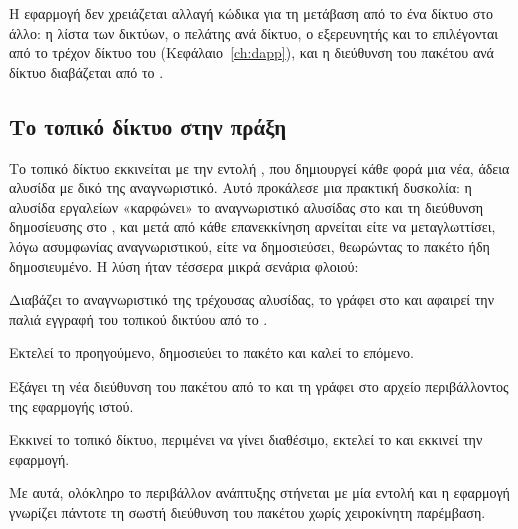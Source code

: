 Η εφαρμογή δεν χρειάζεται αλλαγή κώδικα για τη μετάβαση από το ένα δίκτυο στο άλλο: η
λίστα των δικτύων, ο πελάτης ανά δίκτυο, ο εξερευνητής και το  επιλέγονται από
το τρέχον δίκτυο του  (Κεφάλαιο~\ref{ch:dapp}), και η διεύθυνση του πακέτου
ανά δίκτυο διαβάζεται από το .

\subsection{Το τοπικό δίκτυο στην πράξη}

Το τοπικό δίκτυο εκκινείται με την εντολή
, που δημιουργεί κάθε φορά μια νέα,
άδεια αλυσίδα με δικό της αναγνωριστικό. Αυτό προκάλεσε μια πρακτική δυσκολία: η αλυσίδα εργαλείων «καρφώνει» το αναγνωριστικό αλυσίδας στο
 και τη διεύθυνση δημοσίευσης στο , και μετά από κάθε
επανεκκίνηση αρνείται είτε να μεταγλωττίσει, λόγω ασυμφωνίας αναγνωριστικού, είτε να
δημοσιεύσει, θεωρώντας το πακέτο ήδη δημοσιευμένο. Η λύση ήταν τέσσερα μικρά σενάρια
φλοιού:

\begin{description}[leftmargin=1.2em,itemsep=1pt]
  \item[\code{reset-localnet-pins.sh}] Διαβάζει το αναγνωριστικό της τρέχουσας αλυσίδας,
    το γράφει στο  και αφαιρεί την παλιά εγγραφή του τοπικού δικτύου από
    το .
  \item[\code{deploy.sh}] Εκτελεί το προηγούμενο, δημοσιεύει το πακέτο και καλεί το
    επόμενο.
  \item[\code{sync-env.sh}] Εξάγει τη νέα διεύθυνση του πακέτου από το
     και τη γράφει στο αρχείο περιβάλλοντος της εφαρμογής ιστού.
  \item[\code{dev.sh}] Εκκινεί το τοπικό δίκτυο, περιμένει να γίνει διαθέσιμο, εκτελεί το
     και εκκινεί την εφαρμογή.
\end{description}

Με αυτά, ολόκληρο το περιβάλλον ανάπτυξης στήνεται με μία εντολή και η εφαρμογή γνωρίζει
πάντοτε τη σωστή διεύθυνση του πακέτου χωρίς χειροκίνητη παρέμβαση.
